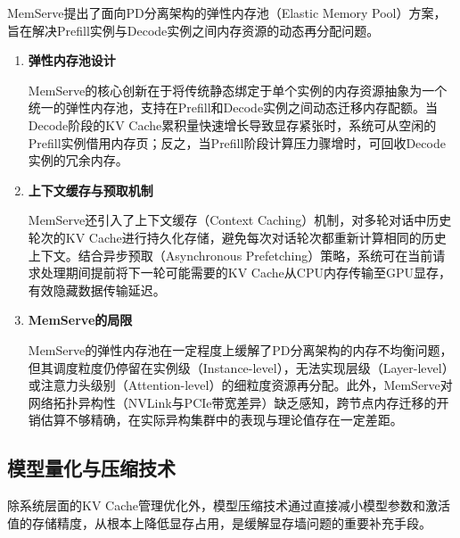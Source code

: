MemServe\cite{hu2024memserve}提出了面向PD分离架构的弹性内存池（Elastic Memory Pool）方案，旨在解决Prefill实例与Decode实例之间内存资源的动态再分配问题。

\begin{enumerate}
    
\item \textbf{弹性内存池设计}

MemServe的核心创新在于将传统静态绑定于单个实例的内存资源抽象为一个统一的弹性内存池，支持在Prefill和Decode实例之间动态迁移内存配额。当Decode阶段的KV Cache累积量快速增长导致显存紧张时，系统可从空闲的Prefill实例借用内存页；反之，当Prefill阶段计算压力骤增时，可回收Decode实例的冗余内存。

\item \textbf{上下文缓存与预取机制}

MemServe还引入了上下文缓存（Context Caching）机制，对多轮对话中历史轮次的KV Cache进行持久化存储，避免每次对话轮次都重新计算相同的历史上下文。结合异步预取（Asynchronous Prefetching）策略，系统可在当前请求处理期间提前将下一轮可能需要的KV Cache从CPU内存传输至GPU显存，有效隐藏数据传输延迟。

\item \textbf{MemServe的局限}

MemServe的弹性内存池在一定程度上缓解了PD分离架构的内存不均衡问题，但其调度粒度仍停留在实例级（Instance-level），无法实现层级（Layer-level）或注意力头级别（Attention-level）的细粒度资源再分配。此外，MemServe对网络拓扑异构性（NVLink与PCIe带宽差异）缺乏感知，跨节点内存迁移的开销估算不够精确，在实际异构集群中的表现与理论值存在一定差距。

\end{enumerate}

\subsection{模型量化与压缩技术}

除系统层面的KV Cache管理优化外，模型压缩技术通过直接减小模型参数和激活值的存储精度，从根本上降低显存占用，是缓解显存墙问题的重要补充手段。


